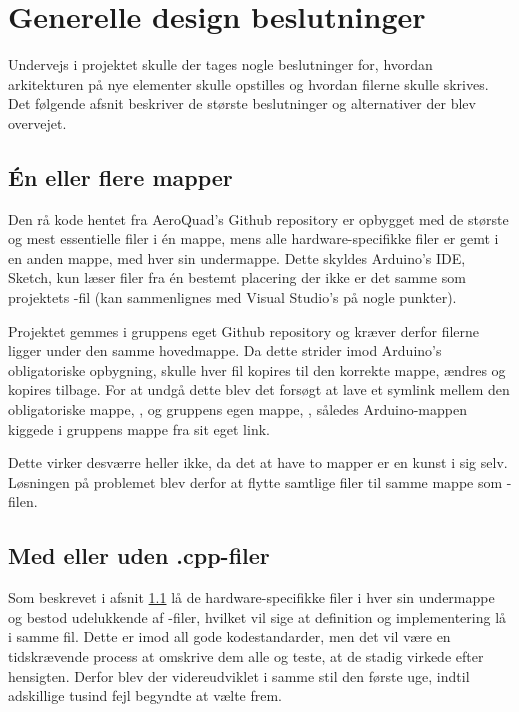 \documentclass[Main]{subfiles}
\begin{document}
\section{Generelle design beslutninger}
Undervejs i projektet skulle der tages nogle beslutninger for, hvordan arkitekturen på nye elementer skulle opstilles og hvordan filerne skulle skrives. 
Det følgende afsnit beskriver de største beslutninger og alternativer der blev overvejet.

\subsection{Én eller flere mapper}\label{Sec:en-flere}
Den rå kode hentet fra AeroQuad's Github repository \cite{Github-AQ} er opbygget med de største og mest essentielle filer i én mappe, mens alle hardware-specifikke filer er gemt i en anden mappe, med hver sin undermappe.
Dette skyldes Arduino's IDE, Sketch, kun læser filer fra én bestemt placering der ikke er det samme som projektets -fil (kan sammenlignes med Visual Studio's  på nogle punkter).

Projektet gemmes i gruppens eget Github repository \cite{Github-IHA} og kræver derfor filerne ligger under den samme hovedmappe.
Da dette strider imod Arduino's obligatoriske opbygning, skulle hver fil kopires til den korrekte mappe, ændres og kopires tilbage.
For at undgå dette blev det forsøgt at lave et symlink\cite{symlink} mellem den obligatoriske mappe, , og gruppens egen mappe, , således Arduino-mappen kiggede i gruppens mappe fra sit eget link.

Dette virker desværre heller ikke, da det at have to mapper er en kunst i sig selv.
Løsningen på problemet blev derfor at flytte samtlige filer til samme mappe som -filen.



\subsection{Med eller uden .cpp-filer}\label{Sec:cpp-filer}
Som beskrevet i afsnit \ref{Sec:en-flere} lå de hardware-specifikke filer i hver sin undermappe og bestod udelukkende af -filer, hvilket vil sige at definition og implementering lå i samme fil.
Dette er imod all gode kodestandarder, men det vil være en tidskrævende process at omskrive dem alle og teste, at de stadig virkede efter hensigten.
Derfor blev der videreudviklet i samme stil den første uge, indtil adskillige tusind fejl begyndte at vælte frem.
\end{document}
